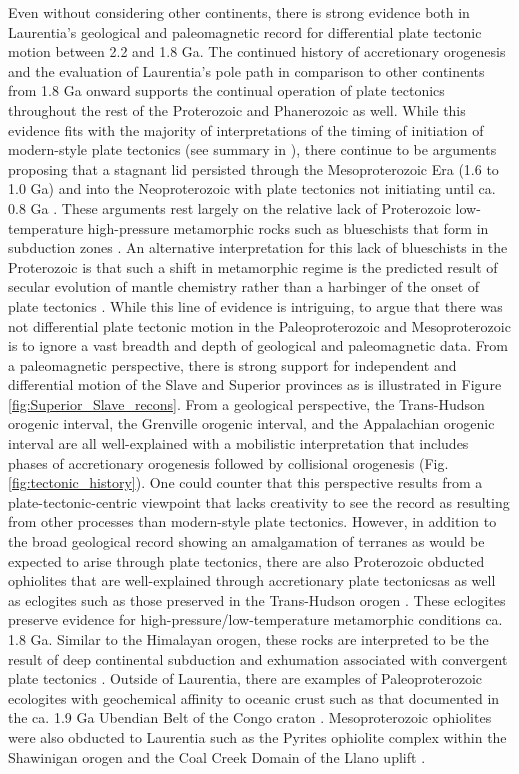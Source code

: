 \documentclass[twocolumn, switch]{article} %
\begin{document}
Even without considering other continents, there is strong evidence both in Laurentia's geological and paleomagnetic record for differential plate tectonic motion between 2.2 and 1.8 Ga. The continued history of accretionary orogenesis and the evaluation of Laurentia's pole path in comparison to other continents from 1.8 Ga onward supports the continual operation of plate tectonics throughout the rest of the Proterozoic and Phanerozoic as well. While this evidence fits with the majority of interpretations of the timing of initiation of modern-style plate tectonics (see summary in \citealp{Korenaga2013a}), there continue to be arguments proposing that a stagnant lid persisted through the Mesoproterozoic Era (1.6 to 1.0 Ga) and into the Neoproterozoic  with plate tectonics not initiating until ca. 0.8 Ga \citep{Hamilton2011a, Stern2018a}. These arguments rest largely on the relative lack of Proterozoic low-temperature high-pressure metamorphic rocks such as blueschists that form in subduction zones \citep{Stern2013a}. An alternative interpretation for this lack of blueschists in the Proterozoic is that such a shift in metamorphic regime is the predicted result of secular evolution of mantle chemistry rather than a harbinger of the onset of plate tectonics \citep{Palin2015a}. While this line of evidence is intriguing, to argue that there was not differential plate tectonic motion in the Paleoproterozoic and Mesoproterozoic is to ignore a vast breadth and depth of geological and paleomagnetic data. From a paleomagnetic perspective, there is strong support for independent and differential motion of the Slave and Superior provinces as is illustrated in Figure \ref{fig:Superior_Slave_recons}. From a geological perspective, the Trans-Hudson orogenic interval, the Grenville orogenic interval, and the Appalachian orogenic interval are all well-explained with a mobilistic interpretation that includes phases of accretionary orogenesis followed by collisional orogenesis (Fig. \ref{fig:tectonic_history}). One could counter that this perspective results from a plate-tectonic-centric viewpoint that lacks creativity to see the record as resulting from other processes than modern-style plate tectonics. However, in addition to the broad geological record showing an amalgamation of terranes as would be expected to arise through plate tectonics, there are also Proterozoic obducted ophiolites that are well-explained through accretionary plate tectonicsas as well as eclogites such as those preserved in the Trans-Hudson orogen \citep{Weller2017a}. These eclogites preserve evidence for high-pressure/low-temperature metamorphic conditions ca. 1.8 Ga. Similar to the Himalayan orogen, these rocks are interpreted to be the result of deep continental subduction and exhumation associated with convergent plate tectonics \citep{Weller2017a}. Outside of Laurentia, there are examples of Paleoproterozoic ecologites with geochemical affinity to oceanic crust such as that documented in the ca. 1.9 Ga Ubendian Belt of the Congo craton \citep{Boniface2012a}. Mesoproterozoic ophiolites were also obducted to Laurentia such as the Pyrites ophiolite complex within the Shawinigan orogen and the Coal Creek Domain of the Llano uplift \citep{Chiarenzelli2011a, McLelland2013a}.
\end{document}
